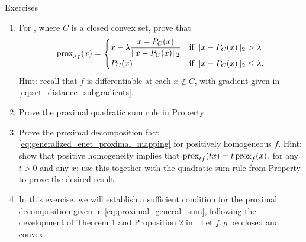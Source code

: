 \begin{xcb}{Exercises}
\begin{enumerate}[label=\thechapter.\arabic*]
\begin{enumerate}[label=\alph*.]
\item For $X = U \Sigma V^\T$ denoting the SVD of $X$, and $\sigma = \sigma(X)$
  is the diagonal of $\Sigma$, prove   
  \[
  \prox_{\lambda f}(X) = U \diag(\prox_g(\sigma)) V^\T,
  \]
  where we use $A = \diag(a)$ to construct a diagonal matrix from a vector $a$.    

\item Using the Schatten $p$-norm connections listed above, check that the
  result from part a reproduces the results for the trace and Frobenius norms, in
  Examples  and 
  .  
  
\item Now use the result from part a to derive the proximal map of the matrix
  rank function, from Example . 
\end{enumerate}

\item For ,
  where $C$ is a closed convex set, prove that    
  \[
  \operatorname{prox}_{\lambda f}(x) = 
  \begin{cases}
  \displaystyle
  x - \lambda \frac{x - P_C(x)}{\|x - P_C(x)\|_2} & 
  \text{if $\|x - P_C(x)\|_2 > \lambda$} \\ 
  P_C(x) & \text{if $\|x - P_C(x)\|_2 \leq \lambda$}.
  \end{cases}
  \]
  Hint: recall that $f$ is differentiable at each $x \notin C$, with gradient
  given in \eqref{eq:set_distance_subgradients}.    

\item Prove the proximal quadratic sum rule in Property
  .  

\item \label{ex:generalized_enet_proximal_mapping}
  Prove the proximal decomposition fact 
  \eqref{eq:generalized_enet_proximal_mapping} for positively homogeneous 
  $f$. Hint: show that positive homogeneity implies that $\operatorname{prox}_{tf}(tx) = t
  \operatorname{prox}_f(x)$, for any $t > 0$ and any $x$; use this together with the quadratic
  sum rule from Property  to prove the
  desired result.  

\item \label{ex:proximal_general_sum}
  In this exercise, we will establish a sufficient condition for the
  proximal decomposition given in \eqref{eq:proximal_general_sum}, following the
  development of Theorem 1 and Proposition 2 in \cite{yu2013decomposing}. Let  
  $f,g$ be closed and convex.   


\end{enumerate}
\end{xcb}

